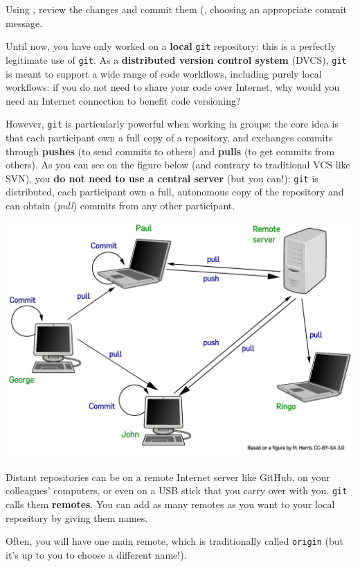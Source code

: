 \documentclass{instructions}
\newcommand{\git}{\texttt{git}\xspace}
\begin{document}
Using , review the changes and commit them (, choosing an appropriate commit message.


Until now, you have only worked on a \textbf{local} \git repository: this is a
perfectly legitimate use of \git. As a \textbf{distributed version control
system} (DVCS), \git is meant to support a wide range of code workflows,
including purely local workflows: if you do not need to share your code over
Internet, why would you need an Internet connection to benefit code versioning?

However, \git is particularly powerful when working in groups: the core idea is
that each participant own a full copy of a repository, and exchanges commits
through \textbf{pushes} (to send commits to others) and \textbf{pulls} (to get
commits from others). As you can see on the figure below (and contrary to
traditional VCS like SVN), you \textbf{do not
need to use a central server} (but you can!): \git is distributed, each
participant own a full, autonomous copy of the repository and can obtain
(\emph{pull}) commits from any other participant.

\begin{center}
    \includegraphics[width=0.8\linewidth]{figs/distributed-git.pdf}
\end{center}

Distant repositories can be on a remote Internet server like GitHub, on your
colleagues' computers,
or even on a USB stick that you carry over with you. \git calls them
\textbf{remotes}. You can add as many remotes as you want to your local
repository by giving them names.

Often, you will have one main remote, which is traditionally called
\texttt{origin} (but it's up to you to choose a different name!).
\end{document}
